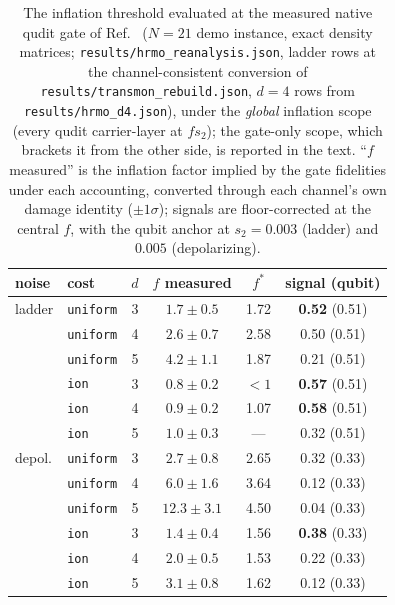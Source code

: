 \documentclass[aps,pra,reprint,superscriptaddress,nofootinbib,floatfix]{revtex4-2}
\begin{document}
\begin{table}[t]
\caption{The inflation threshold evaluated at the measured native
qudit gate of Ref.~\cite{hrmo2023} ($N{=}21$ demo instance, exact
density matrices; \texttt{results/hrmo\_reanalysis.json}, ladder
rows at the channel-consistent conversion of
\texttt{results/transmon\_rebuild.json}, $d=4$ rows from
\texttt{results/hrmo\_d4.json}), under the
\emph{global} inflation scope (every qudit carrier-layer at
$f s_2$); the gate-only scope, which brackets it from the other
side, is reported in the text.
``$f$ measured'' is the inflation factor implied by the gate
fidelities under each accounting, converted through each channel's
own damage identity ($\pm1\sigma$); signals are
floor-corrected at the central $f$, with the qubit anchor at
$s_2=0.003$ (ladder) and $0.005$ (depolarizing).}
\label{tab:hrmo}
\begin{ruledtabular}
\begin{tabular}{llcccc}
noise & cost & $d$ & $f$ measured & $f^\ast$ & signal (qubit) \\
\hline
ladder & \texttt{uniform} & 3 & $1.7\pm0.5$ & 1.72 & \textbf{0.52} (0.51) \\
       & \texttt{uniform} & 4 & $2.6\pm0.7$ & 2.58 & 0.50 (0.51) \\
       & \texttt{uniform} & 5 & $4.2\pm1.1$ & 1.87 & 0.21 (0.51) \\
       & \texttt{ion}     & 3 & $0.8\pm0.2$ & $<1$ & \textbf{0.57} (0.51) \\
       & \texttt{ion}     & 4 & $0.9\pm0.2$ & 1.07 & \textbf{0.58} (0.51) \\
       & \texttt{ion}     & 5 & $1.0\pm0.3$ & --- & 0.32 (0.51) \\
depol. & \texttt{uniform} & 3 & $2.7\pm0.8$ & 2.65 & 0.32 (0.33) \\
       & \texttt{uniform} & 4 & $6.0\pm1.6$ & 3.64 & 0.12 (0.33) \\
       & \texttt{uniform} & 5 & $12.3\pm3.1$ & 4.50 & 0.04 (0.33) \\
       & \texttt{ion}     & 3 & $1.4\pm0.4$ & 1.56 & \textbf{0.38} (0.33) \\
       & \texttt{ion}     & 4 & $2.0\pm0.5$ & 1.53 & 0.22 (0.33) \\
       & \texttt{ion}     & 5 & $3.1\pm0.8$ & 1.62 & 0.12 (0.33) \\
\end{tabular}
\end{ruledtabular}
\end{table}
\end{document}
